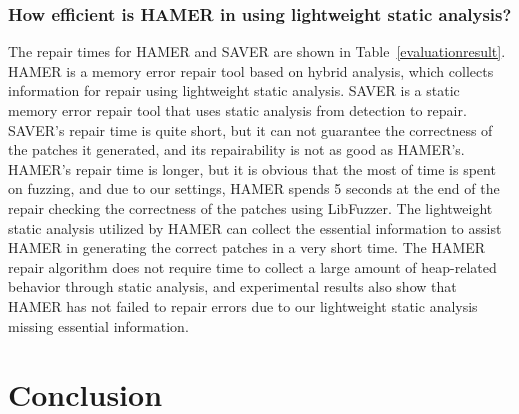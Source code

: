 \documentclass[a4paper,11pt,oneside,openany]{book}
\begin{document}
\vspace{0.4cm}
\hspace{-0.7cm}


\subsection[Research Question 3]{How efficient is HAMER in using lightweight static analysis?}
The repair times for HAMER and SAVER are shown in Table~\ref{evaluationresult}. HAMER is a memory error repair tool based on hybrid analysis, which collects information for repair using lightweight static analysis. SAVER is a static memory error repair tool that uses static analysis from detection to repair. SAVER's repair time is quite short, but it can not guarantee the correctness of the patches it generated, and its repairability is not as good as HAMER's. HAMER's repair time is longer, but it is obvious that the most of time is spent on fuzzing, and due to our settings, HAMER spends 5 seconds at the end of the repair checking the correctness of the patches using LibFuzzer. The lightweight static analysis utilized by HAMER can collect the essential information to assist HAMER in generating the correct patches in a very short time. The HAMER repair algorithm does not require time to collect a large amount of heap-related behavior through static analysis, and experimental results also show that HAMER has not failed to repair errors due to our lightweight static analysis missing essential information.

\vspace{0.4cm}
\hspace{-0.7cm}


\chapter{Conclusion}
\label{conclusion}
\end{document}
